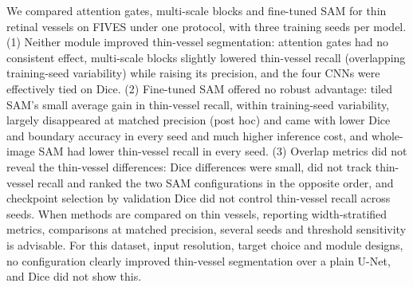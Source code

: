 We compared attention gates, multi-scale blocks and fine-tuned SAM for thin retinal vessels on FIVES under one protocol,
with three training seeds per model. (1) Neither module improved thin-vessel segmentation: attention gates had no
consistent effect, multi-scale blocks slightly lowered thin-vessel recall (overlapping training-seed variability) while
raising its precision, and the four CNNs were effectively tied on Dice. (2) Fine-tuned SAM offered no
robust advantage: tiled SAM's small average gain in thin-vessel recall, within training-seed variability, largely
disappeared at matched precision (post hoc) and came with lower Dice and boundary accuracy in every seed and much higher
inference cost, and whole-image SAM had lower thin-vessel recall in every seed. (3) Overlap metrics did not reveal the
thin-vessel differences: Dice differences were small, did not track thin-vessel recall and ranked the two SAM
configurations in the opposite order, and checkpoint selection by validation Dice did not control thin-vessel recall
across seeds. When methods are compared on thin vessels, reporting width-stratified metrics, comparisons at matched
precision, several seeds and threshold sensitivity is advisable. For this dataset, input resolution, target choice and
module designs, no configuration clearly improved thin-vessel segmentation over a plain U-Net, and Dice did not show this.
